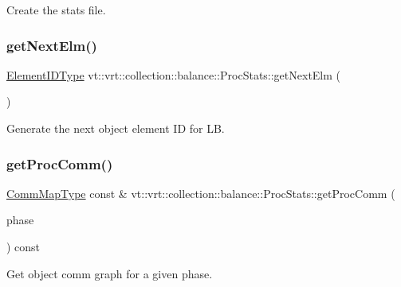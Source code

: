 Create the stats file. 

\mbox{\label{structvt_1_1vrt_1_1collection_1_1balance_1_1_proc_stats_aff0ecd6f0016ebd074b982caad107806}} 
\subsubsection{\texorpdfstring{get\+Next\+Elm()}{getNextElm()}}
{\footnotesize\ttfamily \hyperlink{namespacevt_1_1vrt_1_1collection_1_1balance_a14c8d2c972f2913aa3f1636e5be0a120}{Element\+I\+D\+Type} vt\+::vrt\+::collection\+::balance\+::\+Proc\+Stats\+::get\+Next\+Elm (\begin{DoxyParamCaption}{ }\end{DoxyParamCaption})}



Generate the next object element ID for LB. 

\mbox{\label{structvt_1_1vrt_1_1collection_1_1balance_1_1_proc_stats_ad8cda5635a21134657595fd34dca1f6a}} 
\subsubsection{\texorpdfstring{get\+Proc\+Comm()}{getProcComm()}}
{\footnotesize\ttfamily \hyperlink{namespacevt_1_1vrt_1_1collection_1_1balance_aa50d4cbbfa3c643e7303fc6e08f411fb}{Comm\+Map\+Type} const  \& vt\+::vrt\+::collection\+::balance\+::\+Proc\+Stats\+::get\+Proc\+Comm (\begin{DoxyParamCaption}\item[{\hyperlink{namespacevt_a46ce6733d5cdbd735d561b7b4029f6d7}{Phase\+Type}}]{phase }\end{DoxyParamCaption}) const}



Get object comm graph for a given phase. 


